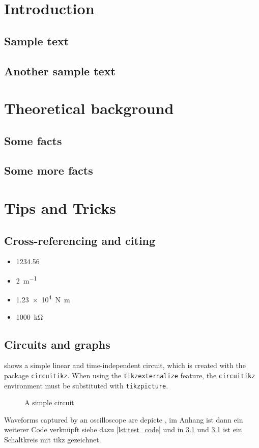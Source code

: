 \chapter{Introduction}
\label{chapter:introduction}
\section{Sample text}
\label{section:sample_text}
\lipsum[1]
\section{Another sample text}
\label{section:another_sample_text}
\lipsum[2]
\chapter{Theoretical background}
\label{chapter:theoretical_bg}
\section{Some facts}
\label{section:some_facts}
\lipsum[1]
\section{Some more facts}
\label{section:some_more_facts}
\lipsum[2]
\chapter{Tips and Tricks}
\label{chapter:tips_and_tricks}
\section{Cross-referencing and citing}
\label{section:cross_ref_and_citing}

\begin{itemize}
	\item \num{1234,56}  %
	\item \SI{2}{\meter^{-1}} %
	\item \SI{1.23e4}{\newton\meter} %
	\item \SI{1000}{\kilo\ohm} %
\end{itemize}
\section{Circuits and graphs}
\label{section:circuits_and_graphs}
 shows a simple linear and time-independent circuit, which is created with the package \texttt{circuitikz}. When using the \texttt{tikzexternalize} feature, the \texttt{circuitikz} environment must be substituted with \texttt{tikzpicture}. 
\begin{figure}[htbp]
	\centering
	
	\caption{A simple circuit}
	\label{fig:demo_circuit}
\end{figure}

Waveforms captured by an oscilloscope are depicte \cite{deutsch}, im Anhang ist dann ein weiterer
Code verknüpft siehe dazu \ref{lst:test_code} und in \cref{fig:demo_circuit} und \ref{fig:demo_circuit} ist ein Schaltkreis mit tikz gezeichnet.
